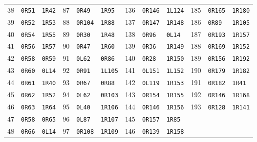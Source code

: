 \begin{center}
\begin{tabular}{rll@{\hspace{12pt}}rll@{\hspace{12pt}}rll@{\hspace{12pt}}rll}
38 & \texttt{0R51} & \texttt{1R42} & 87 & \texttt{0R49} & \texttt{1R95} & 136 & \texttt{0R146} & \texttt{1L124} & 185 & \texttt{0R165} & \texttt{1R180}\\
39 & \texttt{0R52} & \texttt{1R53} & 88 & \texttt{0R104} & \texttt{1R88} & 137 & \texttt{0R147} & \texttt{1R148} & 186 & \texttt{0R89} & \texttt{1R105}\\
40 & \texttt{0R54} & \texttt{1R55} & 89 & \texttt{0R30} & \texttt{1R48} & 138 & \texttt{0R96} & \texttt{0L14} & 187 & \texttt{0R193} & \texttt{1R157}\\
41 & \texttt{0R56} & \texttt{1R57} & 90 & \texttt{0R47} & \texttt{1R60} & 139 & \texttt{0R36} & \texttt{1R149} & 188 & \texttt{0R169} & \texttt{1R152}\\
42 & \texttt{0R58} & \texttt{0R59} & 91 & \texttt{0L62} & \texttt{0R86} & 140 & \texttt{0R28} & \texttt{1R150} & 189 & \texttt{0R156} & \texttt{1R192}\\
43 & \texttt{0R60} & \texttt{0L14} & 92 & \texttt{0R91} & \texttt{1L105} & 141 & \texttt{0L151} & \texttt{1L152} & 190 & \texttt{0R179} & \texttt{1R182}\\
44 & \texttt{0R61} & \texttt{1R40} & 93 & \texttt{0R67} & \texttt{0R88} & 142 & \texttt{0L119} & \texttt{1R153} & 191 & \texttt{0R182} & \texttt{1R41}\\
45 & \texttt{0R62} & \texttt{1R52} & 94 & \texttt{0L62} & \texttt{0R103} & 143 & \texttt{0R154} & \texttt{1R155} & 192 & \texttt{0R146} & \texttt{1R168}\\
46 & \texttt{0R63} & \texttt{1R64} & 95 & \texttt{0L40} & \texttt{1R106} & 144 & \texttt{0R146} & \texttt{1R156} & 193 & \texttt{0R128} & \texttt{1R141}\\
47 & \texttt{0R58} & \texttt{0R65} & 96 & \texttt{0L87} & \texttt{1R107} & 145 & \texttt{0R157} & \texttt{1R85} &  &  & \\
48 & \texttt{0R66} & \texttt{0L14} & 97 & \texttt{0R108} & \texttt{1R109} & 146 & \texttt{0R139} & \texttt{1R158} &  &  & \\
\bottomrule\end{tabular}\end{center}
\clearpage
